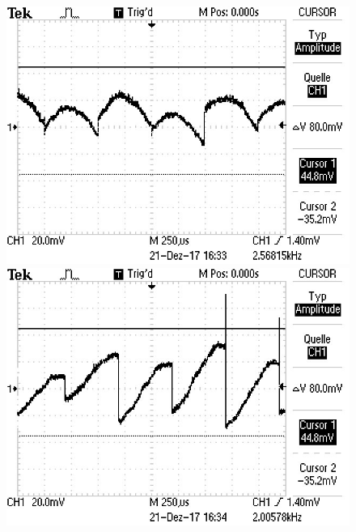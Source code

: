\begin{figure}
\begin{minipage}{0.48\textwidth}
\end{minipage}
\begin{minipage}{0.48\textwidth}
\includegraphics[scale=0.6]{content/images/noise90.jpg}
\end{minipage}
\begin{minipage}{0.48\textwidth}
\includegraphics[scale=0.6]{content/images/noise180.jpg}
\end{minipage}

\end{figure}
